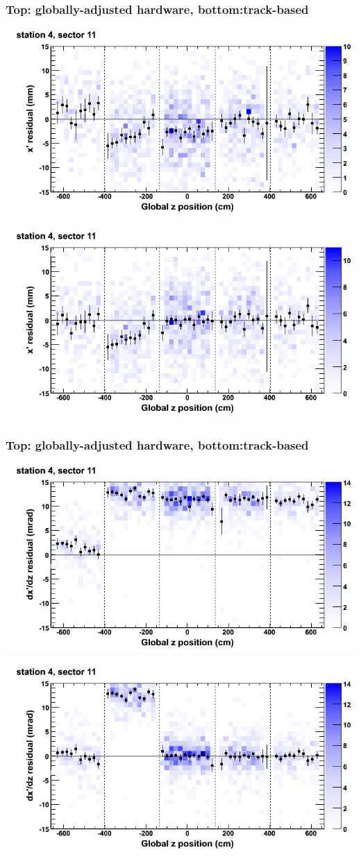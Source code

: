 \documentclass[compress]{beamer}
\begin{document}
\begin{frame}
\frametitle{Top: globally-adjusted hardware, bottom:track-based}
\includegraphics[width=0.7\linewidth]{NOV4_mapplots_HW/DTvsz_st4sec11_x.png}

\includegraphics[width=0.7\linewidth]{NOV4_mapplots/DTvsz_st4sec11_x.png}
\end{frame}

\begin{frame}
\frametitle{Top: globally-adjusted hardware, bottom:track-based}
\includegraphics[width=0.7\linewidth]{NOV4_mapplots_HW/DTvsz_st4sec11_dxdz.png}

\includegraphics[width=0.7\linewidth]{NOV4_mapplots/DTvsz_st4sec11_dxdz.png}
\end{frame}
\end{document}
